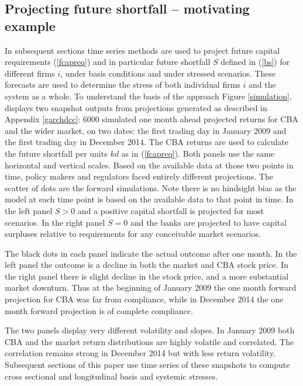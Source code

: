 \documentclass[authoryear]{elsarticle}
\newcommand{\eref}[1]{(\ref{#1})}
\newcommand{\fref}[1]{Figure \ref{#1}}
\newcommand{\aref}[1]{Appendix \ref{#1}}
\begin{document}
\subsection{Projecting future shortfall -- motivating example}
In subsequent sections  time series methods are used to project future capital requirements \eref{fcapreq}  and in particular future shortfall $S$ defined in \eref{bs} for different firms $i$, under basis conditions and under stressed scenarios.   These forecasts are used to determine the stress of both individual firms $i$ and the system as a whole.   To understand the basis of the approach \fref{simulation},   displays two snapshot outputs from projections generated as described  in \aref{garchdcc}:  6000  simulated one month ahead projected returns for  CBA and the wider market, on  two dates: the first trading day in January 2009 and the first trading day in December 2014.  The CBA returns are used to calculate the future shortfall per units $kd$ as in \eref{fcapreq}.  Both panels use the same horizontal and vertical scales.   Based on the available data at those two points in  time, policy makers and regulators faced entirely different projections.   The scatter of dots are the forward simulations.  Note there is no hindsight bias as the model at each time point is based on the available data to that point in time.     In the left panel $S>0$ and a positive capital shortfall is projected for most scenarios.    In the right panel $S=0$ and the banks are projected to have capital surpluses relative to requirements for any conceivable market scenarios.

 The black dots in each panel indicate the actual outcome after one month.    In the left panel the outcome is a decline in both  the market and CBA stock price.    In the right panel there is slight decline in the stock price, and a more substantial market downturn.    Thus at the beginning of January  2009 the one month forward projection for  CBA was far from compliance, while in December 2014 the one month forward projection is of complete compliance.

The two panels  display very different volatility and slopes. In January 2009 both CBA and the market return distributions are highly volatile and correlated. The correlation remains strong in December 2014 but with less return volatility.  Subsequent sections of this paper use time series of these  snapshots  to compute cross sectional and longitudinal basis and systemic stresses.
\end{document}
